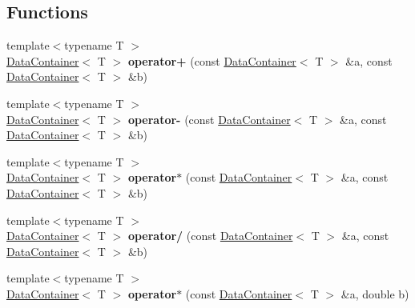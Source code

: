 \subsection*{Functions}
\begin{DoxyCompactItemize}
\item 
\mbox{\label{namespaceQn_ad2da7f7b5cd6d4f0b043d53494b8269e}} 
{\footnotesize template$<$typename T $>$ }\\\mbox{\hyperlink{classQn_1_1DataContainer}{Data\+Container}}$<$ T $>$ {\bfseries operator+} (const \mbox{\hyperlink{classQn_1_1DataContainer}{Data\+Container}}$<$ T $>$ \&a, const \mbox{\hyperlink{classQn_1_1DataContainer}{Data\+Container}}$<$ T $>$ \&b)
\item 
\mbox{\label{namespaceQn_a492cc518ac9ffc211ba6cf8c834e2ea5}} 
{\footnotesize template$<$typename T $>$ }\\\mbox{\hyperlink{classQn_1_1DataContainer}{Data\+Container}}$<$ T $>$ {\bfseries operator-\/} (const \mbox{\hyperlink{classQn_1_1DataContainer}{Data\+Container}}$<$ T $>$ \&a, const \mbox{\hyperlink{classQn_1_1DataContainer}{Data\+Container}}$<$ T $>$ \&b)
\item 
\mbox{\label{namespaceQn_a62ea063709f64d67df0a7cc95fd2aa8c}} 
{\footnotesize template$<$typename T $>$ }\\\mbox{\hyperlink{classQn_1_1DataContainer}{Data\+Container}}$<$ T $>$ {\bfseries operator$\ast$} (const \mbox{\hyperlink{classQn_1_1DataContainer}{Data\+Container}}$<$ T $>$ \&a, const \mbox{\hyperlink{classQn_1_1DataContainer}{Data\+Container}}$<$ T $>$ \&b)
\item 
\mbox{\label{namespaceQn_a4a54bc05506f00e0690503690caeff83}} 
{\footnotesize template$<$typename T $>$ }\\\mbox{\hyperlink{classQn_1_1DataContainer}{Data\+Container}}$<$ T $>$ {\bfseries operator/} (const \mbox{\hyperlink{classQn_1_1DataContainer}{Data\+Container}}$<$ T $>$ \&a, const \mbox{\hyperlink{classQn_1_1DataContainer}{Data\+Container}}$<$ T $>$ \&b)
\item 
\mbox{\label{namespaceQn_a14a5cb38f7a9205648d7fa2e3c9c9cc6}} 
{\footnotesize template$<$typename T $>$ }\\\mbox{\hyperlink{classQn_1_1DataContainer}{Data\+Container}}$<$ T $>$ {\bfseries operator$\ast$} (const \mbox{\hyperlink{classQn_1_1DataContainer}{Data\+Container}}$<$ T $>$ \&a, double b)

\end{DoxyCompactItemize}
